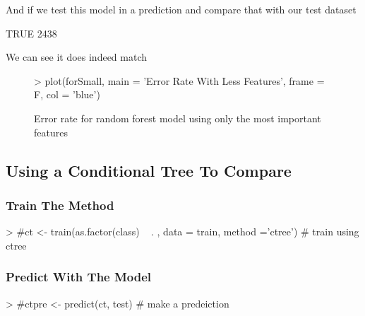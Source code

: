 \documentclass[12pt]{article}         %
\begin{document}
And if we test this model in a prediction and compare that with our test dataset
\begin{Schunk}
\begin{Soutput}
TRUE 
2438 
\end{Soutput}
\end{Schunk}
We can see it does indeed match
\pagebreak
\begin{figure}[H]
\begin{center}
\begin{Schunk}
\begin{Sinput}
> plot(forSmall, main = 'Error Rate With Less Features', frame = F, col = 'blue')
\end{Sinput}
\end{Schunk}
\caption {Error rate for random forest model using only the most important features}
\label{fig6}
\end {center}
\end {figure}

\subsection{Using a Conditional Tree To Compare}
\subsubsection{Train The Method}
\begin{Schunk}
\begin{Sinput}
> #ct <- train(as.factor(class) ~ . , data = train, method ='ctree') # train using ctree
\end{Sinput}
\end{Schunk}

\subsubsection{Predict With The Model}
\begin{Schunk}
\begin{Sinput}
> #ctpre <- predict(ct, test) # make a predeiction 
\end{Sinput}
\end{Schunk}
\end{document}
